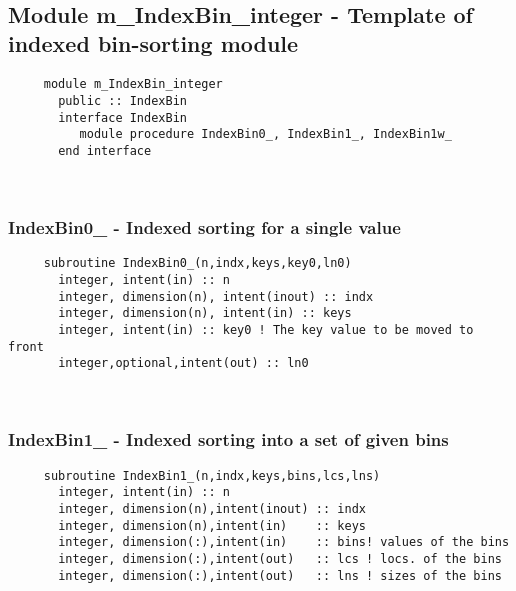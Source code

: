 \mbox{}\hrulefill\ 
 

  \subsection{Module m\_IndexBin\_integer - Template of indexed bin-sorting module }

\begin{verbatim} 
     module m_IndexBin_integer
       public :: IndexBin
       interface IndexBin
          module procedure IndexBin0_, IndexBin1_, IndexBin1w_
       end interface
 \end{verbatim}
%
 
 
\mbox{}\hrulefill\ 
 
  \subsubsection{IndexBin0\_ - Indexed sorting for a single value}

\begin{verbatim} 
     subroutine IndexBin0_(n,indx,keys,key0,ln0)
       integer, intent(in) :: n
       integer, dimension(n), intent(inout) :: indx
       integer, dimension(n), intent(in) :: keys
       integer, intent(in) :: key0 ! The key value to be moved to front
       integer,optional,intent(out) :: ln0
 \end{verbatim} %
 
 
\mbox{}\hrulefill\ 
 
  \subsubsection{IndexBin1\_ - Indexed sorting into a set of given bins}

\begin{verbatim} 
     subroutine IndexBin1_(n,indx,keys,bins,lcs,lns)
       integer, intent(in) :: n
       integer, dimension(n),intent(inout) :: indx
       integer, dimension(n),intent(in)    :: keys
       integer, dimension(:),intent(in)    :: bins! values of the bins
       integer, dimension(:),intent(out)   :: lcs ! locs. of the bins
       integer, dimension(:),intent(out)   :: lns ! sizes of the bins
 \end{verbatim} %
 
